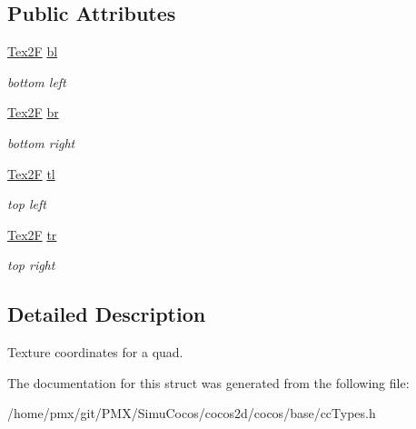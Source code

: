 \subsection*{Public Attributes}
\begin{DoxyCompactItemize}
\item 
\mbox{\label{structT2F__Quad_a69d44aaf28121dcce433c85fb5cdafd0}} 
\hyperlink{structTex2F}{Tex2F} \hyperlink{structT2F__Quad_a69d44aaf28121dcce433c85fb5cdafd0}{bl}
\begin{DoxyCompactList}\small\item\em bottom left \end{DoxyCompactList}\item 
\mbox{\label{structT2F__Quad_a757901425e622b549392166e005ca7ff}} 
\hyperlink{structTex2F}{Tex2F} \hyperlink{structT2F__Quad_a757901425e622b549392166e005ca7ff}{br}
\begin{DoxyCompactList}\small\item\em bottom right \end{DoxyCompactList}\item 
\mbox{\label{structT2F__Quad_a33cec60ade89241c04a948df3d55694a}} 
\hyperlink{structTex2F}{Tex2F} \hyperlink{structT2F__Quad_a33cec60ade89241c04a948df3d55694a}{tl}
\begin{DoxyCompactList}\small\item\em top left \end{DoxyCompactList}\item 
\mbox{\label{structT2F__Quad_acedf9300fd7cc7d09acc71bae6854713}} 
\hyperlink{structTex2F}{Tex2F} \hyperlink{structT2F__Quad_acedf9300fd7cc7d09acc71bae6854713}{tr}
\begin{DoxyCompactList}\small\item\em top right \end{DoxyCompactList}\end{DoxyCompactItemize}


\subsection{Detailed Description}
Texture coordinates for a quad. 

The documentation for this struct was generated from the following file\+:\begin{DoxyCompactItemize}
\item 
/home/pmx/git/\+P\+M\+X/\+Simu\+Cocos/cocos2d/cocos/base/cc\+Types.\+h\end{DoxyCompactItemize}
